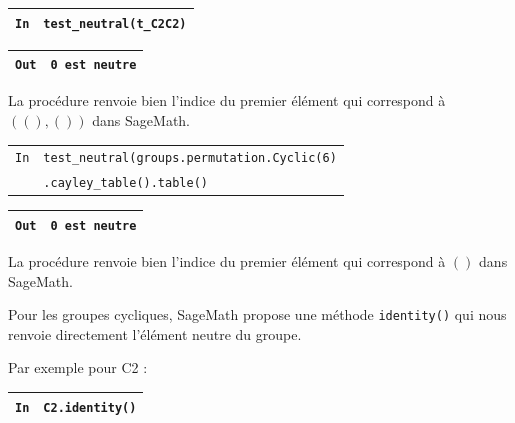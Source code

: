 \documentclass[titlepage]{article}
\begin{document}
        \begin{tabularx}{11.5cm}{|p{0.60cm}|X|}
            \hline
            \verb|In|
            & 
            \verb|test_neutral(t_C2C2)|
            \\
            \hline
        \end{tabularx}

        \begin{tabularx}{11.5cm}{|p{0.60cm}|X|}
            \hline
            \verb|Out|
            & 
            \verb|0 est neutre|
            \\
            \hline
        \end{tabularx} \newline

        La procédure renvoie bien l'indice du premier élément qui correspond à $((), ())$ dans SageMath. \newline

        \begin{tabularx}{11.5cm}{|p{0.60cm}|X|}
            \hline
            \verb|In|
            & 
            \verb|test_neutral(groups.permutation.Cyclic(6)|
            \\
            \verb||
            & 
            \verb|.cayley_table().table()|
            \\
            \hline
        \end{tabularx}

        \begin{tabularx}{11.5cm}{|p{0.60cm}|X|}
            \hline
            \verb|Out|
            & 
            \verb|0 est neutre|
            \\
            \hline
        \end{tabularx}\newline

        La procédure renvoie bien l'indice du premier élément qui correspond à $()$ dans SageMath. \newline

        Pour les groupes cycliques, SageMath propose une méthode \verb|identity()| qui nous renvoie directement l'élément neutre du groupe.
        
        Par exemple pour C2 : \newline

        \begin{tabularx}{11.5cm}{|p{0.60cm}|X|}
            \hline
            \verb|In|
            & 
            \verb|C2.identity()|
            \\
            \hline
        \end{tabularx}
\end{document}
